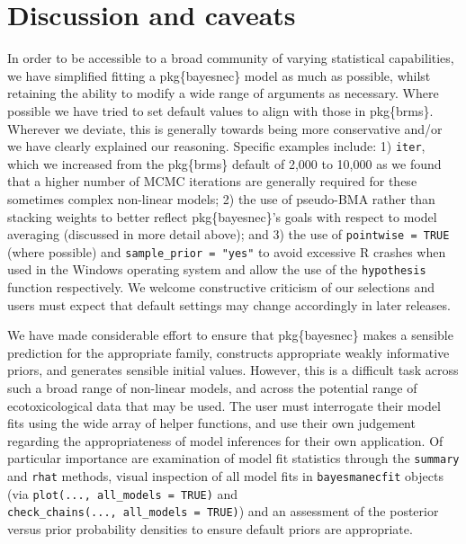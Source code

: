 \documentclass[
]{jss}
\begin{document}
\hypertarget{discussion-and-caveats}{%
\section{Discussion and caveats}\label{discussion-and-caveats}}

In order to be accessible to a broad community of varying statistical
capabilities, we have simplified fitting a pkg\{bayesnec\} model as much
as possible, whilst retaining the ability to modify a wide range of
arguments as necessary. Where possible we have tried to set default
values to align with those in pkg\{brms\}. Wherever we deviate, this is
generally towards being more conservative and/or we have clearly
explained our reasoning. Specific examples include: 1) \texttt{iter},
which we increased from the pkg\{brms\} default of 2,000 to 10,000 as we
found that a higher number of MCMC iterations are generally required for
these sometimes complex non-linear models; 2) the use of pseudo-BMA
rather than stacking weights to better reflect pkg\{bayesnec\}'s goals
with respect to model averaging (discussed in more detail above); and 3)
the use of \texttt{pointwise\ =\ TRUE} (where possible) and
\texttt{sample\_prior\ =\ "yes"} to avoid excessive R crashes when used
in the Windows operating system and allow the use of the
\texttt{hypothesis} function respectively. We welcome constructive
criticism of our selections and users must expect that default settings
may change accordingly in later releases.

We have made considerable effort to ensure that pkg\{bayesnec\} makes a
sensible prediction for the appropriate family, constructs appropriate
weakly informative priors, and generates sensible initial values.
However, this is a difficult task across such a broad range of
non-linear models, and across the potential range of ecotoxicological
data that may be used. The user must interrogate their model fits using
the wide array of helper functions, and use their own judgement
regarding the appropriateness of model inferences for their own
application. Of particular importance are examination of model fit
statistics through the \texttt{summary} and \texttt{rhat} methods,
visual inspection of all model fits in \texttt{bayesmanecfit} objects
(via \texttt{plot(...,\ all\_models\ =\ TRUE)} and
\texttt{check\_chains(...,\ all\_models\ =\ TRUE)}) and an assessment of
the posterior versus prior probability densities to ensure default
priors are appropriate.
\end{document}
